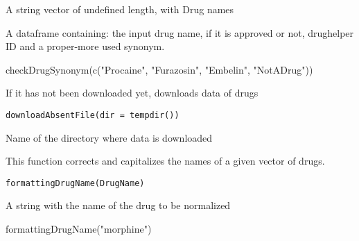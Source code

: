 \documentclass[a4paper]{book}
\begin{document}
%
\begin{Arguments}
\begin{ldescription}
\item[\code{drugVector}] A string vector of undefined length, with Drug names
\end{ldescription}
\end{Arguments}
%
\begin{Value}
A dataframe containing: the input drug name, if it is approved or not, drughelper ID and a proper-more used synonym.
\end{Value}
%
\begin{Examples}
\begin{ExampleCode}
checkDrugSynonym(c("Procaine", "Furazosin", "Embelin", "NotADrug"))
\end{ExampleCode}
\end{Examples}
%
\begin{Description}\relax
If it has not been downloaded yet, downloads data of drugs
\end{Description}
%
\begin{Usage}
\begin{verbatim}
downloadAbsentFile(dir = tempdir())
\end{verbatim}
\end{Usage}
%
\begin{Arguments}
\begin{ldescription}
\item[\code{dir}] Name of the directory where data is downloaded
\end{ldescription}
\end{Arguments}
%
\begin{Description}\relax
This function corrects and capitalizes the names of a given vector of drugs.
\end{Description}
%
\begin{Usage}
\begin{verbatim}
formattingDrugName(DrugName)
\end{verbatim}
\end{Usage}
%
\begin{Arguments}
\begin{ldescription}
\item[\code{DrugName}] A string with the name of the drug to be normalized
\end{ldescription}
\end{Arguments}
%
\begin{Examples}
\begin{ExampleCode}
formattingDrugName("morphine")
\end{ExampleCode}
\end{Examples}
\printindex{}
\end{document}
